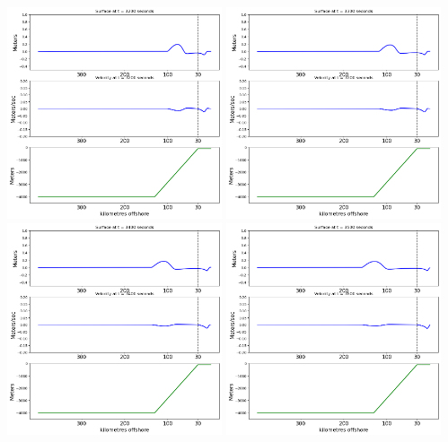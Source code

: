 \documentclass[11pt]{article}
\begin{document}
\vskip 10pt 
\includegraphics[width=0.475\textwidth]{frame0032fig2.png}
\vskip 10pt 
\includegraphics[width=0.475\textwidth]{frame0033fig2.png}
\vskip 10pt 
\includegraphics[width=0.475\textwidth]{frame0034fig2.png}
\vskip 10pt 
\includegraphics[width=0.475\textwidth]{frame0035fig2.png}
\end{document}
